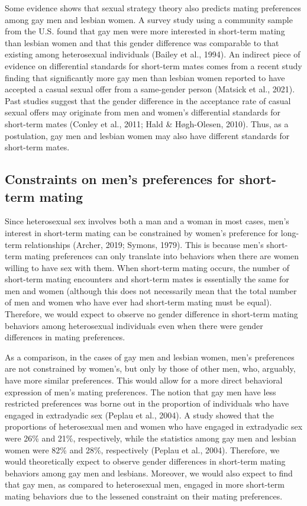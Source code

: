 \documentclass[
  11pt,
]{article}
\begin{document}
Some evidence shows that sexual strategy theory also predicts mating
preferences among gay men and lesbian women. A survey study using a
community sample from the U.S. found that gay men were more interested
in short-term mating than lesbian women and that this gender difference
was comparable to that existing among heterosexual individuals (Bailey
et al., 1994). An indirect piece of evidence on differential standards
for short-term mates comes from a recent study finding that
significantly more gay men than lesbian women reported to have accepted
a casual sexual offer from a same-gender person (Matsick et al., 2021).
Past studies suggest that the gender difference in the acceptance rate
of casual sexual offers may originate from men and women's differential
standards for short-term mates (Conley et al., 2011; Hald \&
Høgh-Olesen, 2010). Thus, as a postulation, gay men and lesbian women
may also have different standards for short-term mates.

\hypertarget{constraints-on-mens-preferences-for-short-term-mating}{%
\subsection{Constraints on men's preferences for short-term
mating}\label{constraints-on-mens-preferences-for-short-term-mating}}

Since heterosexual sex involves both a man and a woman in most cases,
men's interest in short-term mating can be constrained by women's
preference for long-term relationships (Archer, 2019; Symons, 1979).
This is because men's short-term mating preferences can only translate
into behaviors when there are women willing to have sex with them. When
short-term mating occurs, the number of short-term mating encounters and
short-term mates is essentially the same for men and women (although
this does not necessarily mean that the total number of men and women
who have ever had short-term mating must be equal). Therefore, we would
expect to observe no gender difference in short-term mating behaviors
among heterosexual individuals even when there were gender differences
in mating preferences.

As a comparison, in the cases of gay men and lesbian women, men's
preferences are not constrained by women's, but only by those of other
men, who, arguably, have more similar preferences. This would allow for
a more direct behavioral expression of men's mating preferences. The
notion that gay men have less restricted preferences was borne out in
the proportion of individuals who have engaged in extradyadic sex
(Peplau et al., 2004). A study showed that the proportions of
heterosexual men and women who have engaged in extradyadic sex were 26\%
and 21\%, respectively, while the statistics among gay men and lesbian
women were 82\% and 28\%, respectively (Peplau et al., 2004). Therefore,
we would theoretically expect to observe gender differences in
short-term mating behaviors among gay men and lesbians. Moreover, we
would also expect to find that gay men, as compared to heterosexual men,
engaged in more short-term mating behaviors due to the lessened
constraint on their mating preferences.
\end{document}
